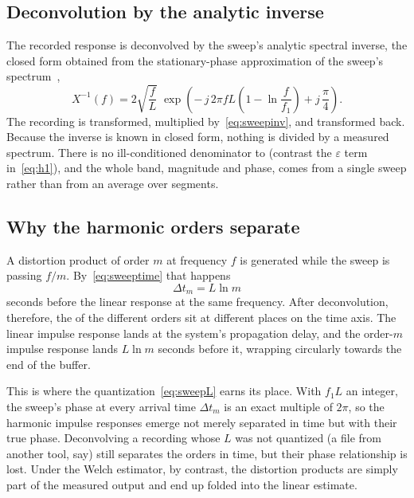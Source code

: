 \subsection{Deconvolution by the analytic inverse}
The recorded response is deconvolved by the sweep's analytic spectral inverse, the closed form obtained from the stationary-phase approximation of the sweep's spectrum~\cite{Novak2015},
\begin{equation}
  X^{-1}(f) = 2\sqrt{\frac{f}{L}}\;
    \exp\!\left( -\,j\,2\pi f L
      \left( 1 - \ln\frac{f}{f_1} \right) + j\,\frac{\pi}{4} \right).
  \label{eq:sweepinv}
\end{equation}
The recording is transformed, multiplied by~\eqref{eq:sweepinv}, and transformed back. Because the inverse is known in closed form, nothing is divided by a measured spectrum. There is no ill-conditioned denominator to  (contrast the $\varepsilon$ term in~\eqref{eq:h1}), and the whole band, magnitude and phase, comes from a single sweep rather than from an average over segments.

\subsection{Why the harmonic orders separate}\label{sec:sweepharm}
A distortion product of order $m$ at frequency $f$ is generated while the sweep is passing $f/m$. By~\eqref{eq:sweeptime} that happens
\begin{equation}
  \Delta t_m = L \ln m
  \label{eq:sweepharmoffset}
\end{equation}
seconds before the linear response at the same frequency. After deconvolution, therefore, the  of the different orders sit at different places on the time axis. The linear impulse response lands at the system's propagation delay, and the order-$m$ impulse response lands $L \ln m$ seconds before it, wrapping circularly towards the end of the buffer.

This is where the quantization~\eqref{eq:sweepL} earns its place. With $f_1 L$ an integer, the sweep's phase at every arrival time $\Delta t_m$ is an exact multiple of $2\pi$, so the harmonic impulse responses emerge not merely separated in time but with their true phase. Deconvolving a recording whose $L$ was not quantized (a file from another tool, say) still separates the orders in time, but their phase relationship is lost. Under the Welch estimator, by contrast, the distortion products are simply part of the measured output and end up folded into the linear estimate.

